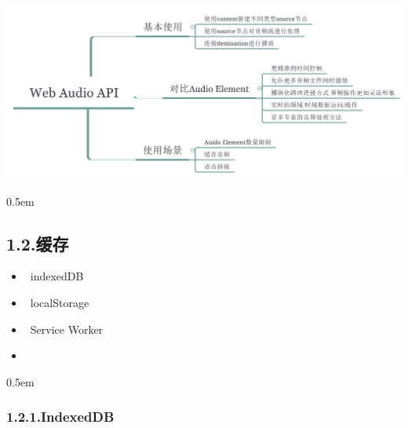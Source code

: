 \documentclass{article}
\begin{document}
\begin{mdcenter}%

\noindent{}\includegraphics[keepaspectratio=true,width=\dimmin{}{\dimwidth{0.90}}]{images/Web-Audio-API}{}%
\end{mdcenter}%

\begin{mdbmargintb}{}{0.5em}%
\subsection{{1.2.\hspace*{0.5em}缓存}}\label{section}%
\end{mdbmargintb}%

\begin{itemize}[noitemsep,topsep=\mdcompacttopsep]%

\item{}~indexedDB%

\item{}~localStorage%

\item{}~Service Worker%

\item{}~%
\end{itemize}%

\begin{mdbmargintb}{}{0.5em}%
\subsubsection{1.2.1.\hspace*{0.5em}IndexedDB}\label{sec-indexeddb}%
\end{mdbmargintb}%
\end{document}
